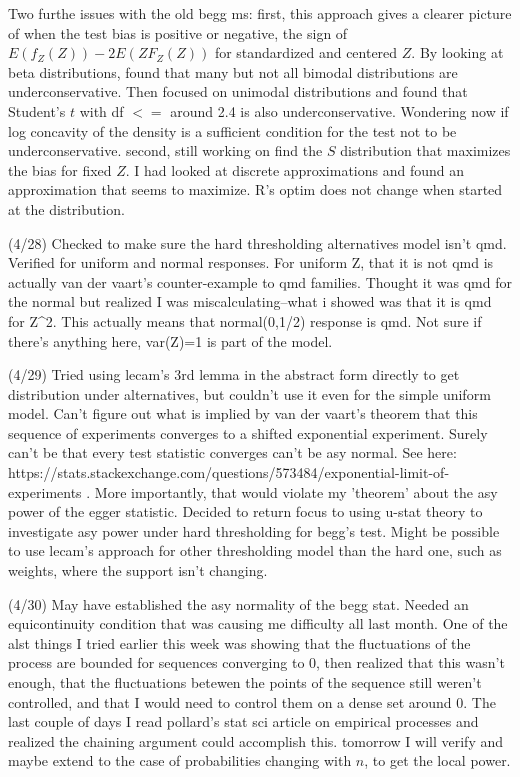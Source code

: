 \documentclass{article}
\begin{document}
Two furthe issues with the old begg ms: first, this approach gives a
clearer picture of when the test bias is positive or negative, the
sign of $E(f_Z(Z)) - 2E(ZF_Z(Z))$ for standardized and centered
$Z$. By looking at beta distributions, found that many but not all
bimodal distributions are underconservative. Then focused on unimodal
distributions and found that Student's $t$ with df $<=$ around 2.4 is
also underconservative. Wondering now if log concavity of the density
is a sufficient condition for the test not to be underconservative.
second, still working on find the $S$ distribution that maximizes the
bias for fixed $Z$.  I had looked at discrete approximations and found
an approximation that seems to maximize. R's optim does not change
when started at the distribution.



(4/28) Checked to make sure the hard thresholding alternatives model
isn't qmd. Verified for uniform and normal responses. For uniform Z,
that it is not qmd is actually van der vaart's counter-example to qmd
families. Thought it was qmd for the normal but realized I was
miscalculating--what i showed was that it is qmd for Z^2. This
actually means that normal(0,1/2) response is qmd. Not sure if there's
anything here, var(Z)=1 is part of the model.

(4/29) Tried using lecam's 3rd lemma in the abstract form directly to
get distribution under alternatives, but couldn't use it even for the
simple uniform model. Can't figure out what is implied by van der
vaart's theorem that this sequence of experiments converges to a
shifted exponential experiment. Surely can't be that every test
statistic converges can't be asy normal. See here:
https://stats.stackexchange.com/questions/573484/exponential-limit-of-experiments
. More importantly, that would violate my 'theorem' about the asy
power of the egger statistic. Decided to return focus to using u-stat
theory to investigate asy power under hard thresholding for begg's
test. Might be possible to use lecam's approach for other thresholding
model than the hard one, such as weights, where the support isn't
changing.

(4/30) May have established the asy normality of the begg stat. Needed
an equicontinuity condition that was causing me difficulty all last
month. One of the alst things I tried earlier this week was showing
that the fluctuations of the process are bounded for sequences
converging to 0, then realized that this wasn't enough, that the
fluctuations betewen the points of the sequence still weren't
controlled, and that I would need to control them on a dense set
around 0. The last couple of days I read pollard's stat sci article on
empirical processes and realized the chaining argument could
accomplish this. tomorrow I will verify and maybe extend to the case
of probabilities changing with $n$, to get the local power.
\end{document}
